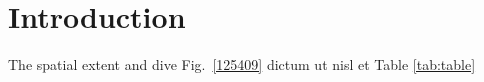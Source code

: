 \section{Introduction}
\label{introduction}

The spatial extent and dive Fig.~\ref{125409} dictum ut nisl et Table \ref{tab:table}
